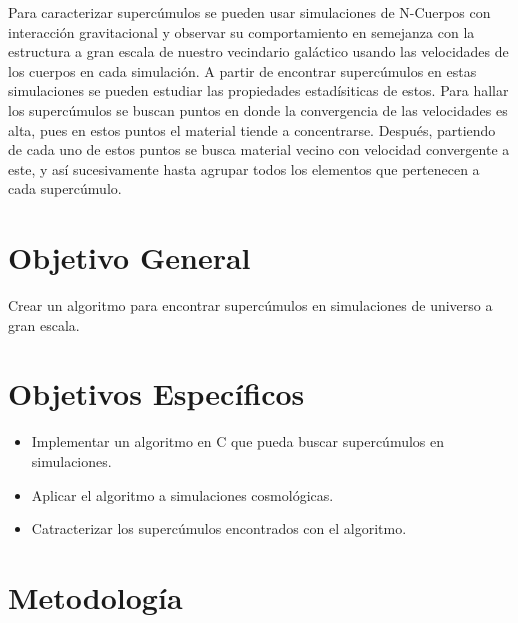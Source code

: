 \documentclass[12pt]{article}
\begin{document}
Para caracterizar supercúmulos se pueden usar simulaciones de N-Cuerpos con interacción gravitacional y observar su comportamiento en semejanza con la estructura a gran escala de nuestro vecindario galáctico usando las velocidades de los cuerpos en cada simulación. A partir de encontrar supercúmulos en estas simulaciones se pueden estudiar las propiedades estadísiticas de estos. Para hallar los supercúmulos se buscan puntos en donde la convergencia de las velocidades es alta, pues en estos puntos el material tiende a concentrarse. Después, partiendo de cada uno de estos puntos se busca material vecino con velocidad convergente a este, y así sucesivamente hasta agrupar todos los elementos que pertenecen a cada supercúmulo.

\section{Objetivo General}


Crear un algoritmo para encontrar supercúmulos en simulaciones de universo a gran escala.


\section{Objetivos Específicos}


\begin{itemize}
	\item Implementar un algoritmo en C que pueda buscar supercúmulos en simulaciones.
	\item Aplicar el algoritmo a simulaciones cosmológicas.
	\item Catracterizar los supercúmulos encontrados con el algoritmo.
\end{itemize}

\section{Metodología}

\end{document}
